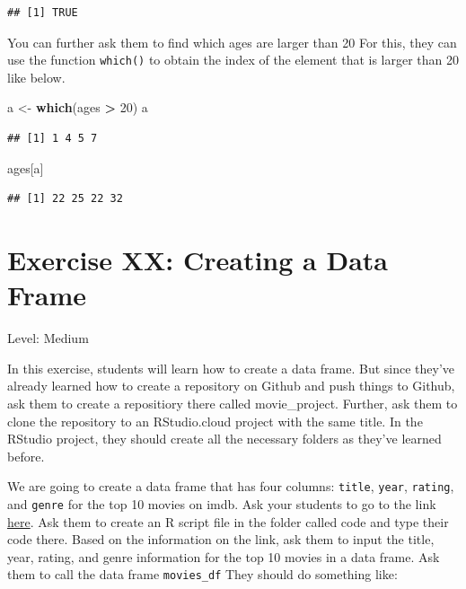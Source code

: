 \documentclass[]{book}
\newenvironment{Shaded}{\begin{snugshade}}{\end{snugshade}}
\newcommand{\DecValTok}[1]{\textcolor[rgb]{0.00,0.00,0.81}{#1}}
\newcommand{\KeywordTok}[1]{\textcolor[rgb]{0.13,0.29,0.53}{\textbf{#1}}}
\newcommand{\NormalTok}[1]{#1}
\newcommand{\OperatorTok}[1]{\textcolor[rgb]{0.81,0.36,0.00}{\textbf{#1}}}
\newcommand{\StringTok}[1]{\textcolor[rgb]{0.31,0.60,0.02}{#1}}
\begin{document}
\begin{verbatim}
## [1] TRUE
\end{verbatim}

You can further ask them to find which ages are larger than 20 For this, they can use the function \texttt{which()} to obtain the index of the element that is larger than 20 like below.

\begin{Shaded}
\begin{Highlighting}[]
\NormalTok{a <-}\StringTok{ }\KeywordTok{which}\NormalTok{(ages }\OperatorTok{>}\StringTok{ }\DecValTok{20}\NormalTok{)}
\NormalTok{a}
\end{Highlighting}
\end{Shaded}

\begin{verbatim}
## [1] 1 4 5 7
\end{verbatim}

\begin{Shaded}
\begin{Highlighting}[]
\NormalTok{ages[a]}
\end{Highlighting}
\end{Shaded}

\begin{verbatim}
## [1] 22 25 22 32
\end{verbatim}

\hypertarget{exercise-xx-creating-a-data-frame}{%
\section*{Exercise XX: Creating a Data Frame}\label{exercise-xx-creating-a-data-frame}}

Level: Medium

In this exercise, students will learn how to create a data frame. But since they've already learned how to create a repository on Github and push things to Github, ask them to create a repositiory there called movie\_project. Further, ask them to clone the repository to an RStudio.cloud project with the same title. In the RStudio project, they should create all the necessary folders as they've learned before.

We are going to create a data frame that has four columns: \texttt{title}, \texttt{year}, \texttt{rating}, and \texttt{genre} for the top 10 movies on imdb. Ask your students to go to the link \href{https://www.imdb.com/search/title?genres=drama\&groups=top_250\&sort=user_rating}{here}. Ask them to create an R script file in the folder called code and type their code there. Based on the information on the link, ask them to input the title, year, rating, and genre information for the top 10 movies in a data frame. Ask them to call the data frame \texttt{movies\_df} They should do something like:
\end{document}
